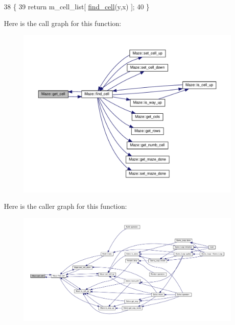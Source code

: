 \begin{DoxyCode}
38 \{
39     \textcolor{keywordflow}{return} m\_cell\_list[  \hyperlink{classMaze_aa59b935dcd5f7129636cea6e40882c56}{find\_cell}(y,x)  ];
40 \}
\end{DoxyCode}
Here is the call graph for this function\+:\nopagebreak
\begin{figure}[H]
\begin{center}
\leavevmode
\includegraphics[width=350pt]{classMaze_ae07191c6ec3cc47fce1147bc3f03a8ad_cgraph}
\end{center}
\end{figure}
Here is the caller graph for this function\+:\nopagebreak
\begin{figure}[H]
\begin{center}
\leavevmode
\includegraphics[width=350pt]{classMaze_ae07191c6ec3cc47fce1147bc3f03a8ad_icgraph}
\end{center}
\end{figure}
\mbox{\label{classMaze_a8a04cd1335e96a80358181afa164d4c9}} 
